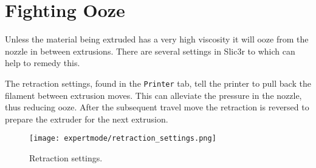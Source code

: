 
\section{Fighting Ooze} %
\label{sec:fighting_ooze}

Unless the material being extruded has a very high viscosity it will ooze from the nozzle in between extrusions.  There are several settings in Slic3r to which can help to remedy this.

The retraction settings, found in the \texttt{Printer} tab, tell the printer to pull back the filament between extrusion moves.  This can alleviate the pressure in the nozzle, thus reducing ooze.  After the subsequent travel move the retraction is reversed to prepare the extruder for the next extrusion.

\begin{figure}[H]
\centering
\texttt{[image: expertmode/retraction\_settings.png]}
\caption{Retraction settings.}
\label{fig:retraction_settings}
\end{figure}

